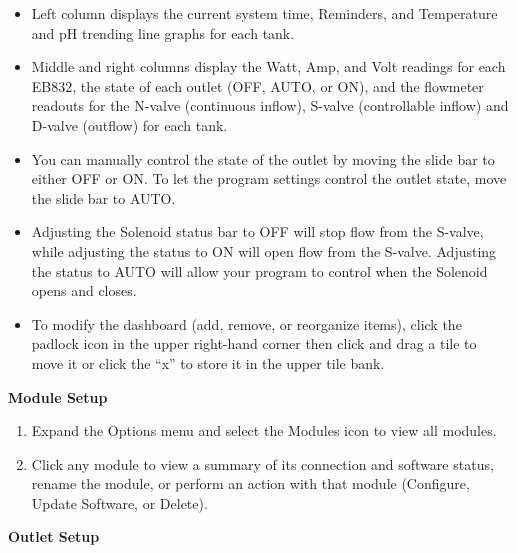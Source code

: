 \documentclass[]{book}
\providecommand{\tightlist}{%
  \setlength{\itemsep}{0pt}\setlength{\parskip}{0pt}}
\begin{document}
\begin{itemize}
\tightlist
\item
  Left column displays the current system time, Reminders, and
  Temperature and pH trending line graphs for each tank.
\item
  Middle and right columns display the Watt, Amp, and Volt readings for
  each EB832, the state of each outlet (OFF, AUTO, or ON), and the
  flowmeter readouts for the N-valve (continuous inflow), S-valve
  (controllable inflow) and D-valve (outflow) for each tank.
\item
  You can manually control the state of the outlet by moving the slide
  bar to either OFF or ON. To let the program settings control the
  outlet state, move the slide bar to AUTO.
\item
  Adjusting the Solenoid status bar to OFF will stop flow from the
  S-valve, while adjusting the status to ON will open flow from the
  S-valve. Adjusting the status to AUTO will allow your program to
  control when the Solenoid opens and closes.
\item
  To modify the dashboard (add, remove, or reorganize items), click the
  padlock icon in the upper right-hand corner then click and drag a tile
  to move it or click the ``x'' to store it in the upper tile bank.
\end{itemize}

 \textbf{Module Setup}

\begin{enumerate}
\def\labelenumi{\arabic{enumi}.}
\tightlist
\item
  Expand the Options menu and select the Modules icon to view all
  modules.
\item
  Click any module to view a summary of its connection and software
  status, rename the module, or perform an action with that module
  (Configure, Update Software, or Delete).
\end{enumerate}

 \textbf{Outlet Setup}
\end{document}
